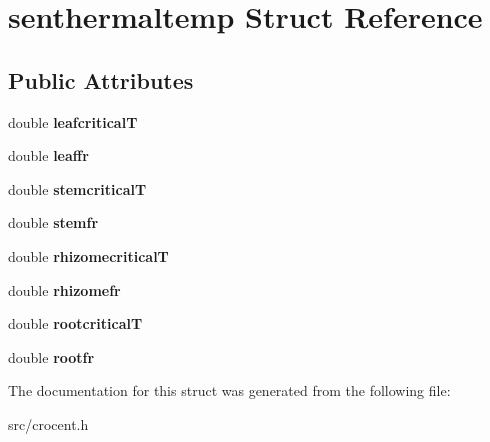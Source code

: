 \hypertarget{structsenthermaltemp}{\section{senthermaltemp Struct Reference}
\label{structsenthermaltemp}
}
\subsection*{Public Attributes}
\begin{DoxyCompactItemize}
\item 
\hypertarget{structsenthermaltemp_a2da10cfc0a6edf07c34f4bfa29ab56e2}{double {\bfseries leafcritical\-T}}\label{structsenthermaltemp_a2da10cfc0a6edf07c34f4bfa29ab56e2}

\item 
\hypertarget{structsenthermaltemp_a99e2529d7c0737344938a15b88e09f76}{double {\bfseries leaffr}}\label{structsenthermaltemp_a99e2529d7c0737344938a15b88e09f76}

\item 
\hypertarget{structsenthermaltemp_a5b68260aa0505d1a847b61c8f9921535}{double {\bfseries stemcritical\-T}}\label{structsenthermaltemp_a5b68260aa0505d1a847b61c8f9921535}

\item 
\hypertarget{structsenthermaltemp_ae74dcee4882ff6ffba4de9234a392096}{double {\bfseries stemfr}}\label{structsenthermaltemp_ae74dcee4882ff6ffba4de9234a392096}

\item 
\hypertarget{structsenthermaltemp_a56369a770de25f94d44eb767a586f919}{double {\bfseries rhizomecritical\-T}}\label{structsenthermaltemp_a56369a770de25f94d44eb767a586f919}

\item 
\hypertarget{structsenthermaltemp_a7beba80d2c50096eaca50c7bf26ecf3d}{double {\bfseries rhizomefr}}\label{structsenthermaltemp_a7beba80d2c50096eaca50c7bf26ecf3d}

\item 
\hypertarget{structsenthermaltemp_ab7dc4c2d88048ab5353f8b04ea2fe41a}{double {\bfseries rootcritical\-T}}\label{structsenthermaltemp_ab7dc4c2d88048ab5353f8b04ea2fe41a}

\item 
\hypertarget{structsenthermaltemp_a0afdc9863e4bcb5b8d54b3ea0077cfcd}{double {\bfseries rootfr}}\label{structsenthermaltemp_a0afdc9863e4bcb5b8d54b3ea0077cfcd}

\end{DoxyCompactItemize}


The documentation for this struct was generated from the following file\-:\begin{DoxyCompactItemize}
\item 
src/crocent.\-h\end{DoxyCompactItemize}
